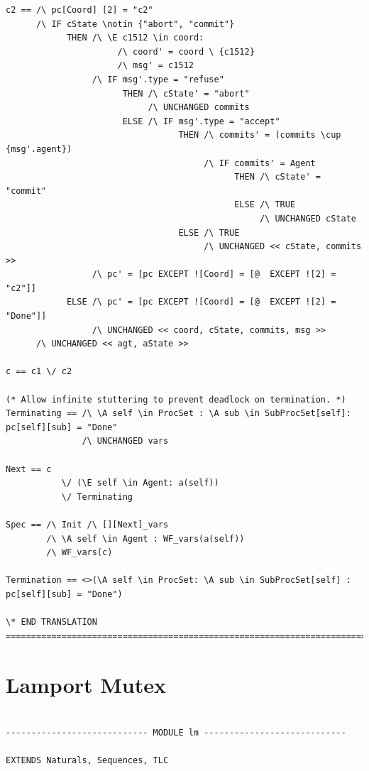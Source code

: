 \documentclass{thesul}
\newcommand{\tlaplus}{TLA\textsuperscript{+}\xspace}
\begin{document}
\begin{appendices}
\begin{lstlisting}[caption = \tlaplus translation for Sub-Processes, frame = tlrb, firstnumber = 1]
c2 == /\ pc[Coord] [2] = "c2"
      /\ IF cState \notin {"abort", "commit"}
            THEN /\ \E c1512 \in coord:
                      /\ coord' = coord \ {c1512}
                      /\ msg' = c1512
                 /\ IF msg'.type = "refuse"
                       THEN /\ cState' = "abort"
                            /\ UNCHANGED commits
                       ELSE /\ IF msg'.type = "accept"
                                  THEN /\ commits' = (commits \cup {msg'.agent})
                                       /\ IF commits' = Agent
                                             THEN /\ cState' = "commit"
                                             ELSE /\ TRUE
                                                  /\ UNCHANGED cState
                                  ELSE /\ TRUE
                                       /\ UNCHANGED << cState, commits >>
                 /\ pc' = [pc EXCEPT ![Coord] = [@  EXCEPT ![2] = "c2"]]
            ELSE /\ pc' = [pc EXCEPT ![Coord] = [@  EXCEPT ![2] = "Done"]]
                 /\ UNCHANGED << coord, cState, commits, msg >>
      /\ UNCHANGED << agt, aState >>

c == c1 \/ c2

(* Allow infinite stuttering to prevent deadlock on termination. *)
Terminating == /\ \A self \in ProcSet : \A sub \in SubProcSet[self]: pc[self][sub] = "Done"
               /\ UNCHANGED vars

Next == c
           \/ (\E self \in Agent: a(self))
           \/ Terminating

Spec == /\ Init /\ [][Next]_vars
        /\ \A self \in Agent : WF_vars(a(self))
        /\ WF_vars(c)

Termination == <>(\A self \in ProcSet: \A sub \in SubProcSet[self] : pc[self][sub] = "Done")

\* END TRANSLATION
=============================================================================

\end{lstlisting}

\section{Lamport Mutex}
\begin{lstlisting}[caption = \tlaplus translation for Sub-Processes, frame = tlrb, firstnumber = 1]

---------------------------- MODULE lm ----------------------------

EXTENDS Naturals, Sequences, TLC


\end{lstlisting}
\end{appendices}
\end{document}
